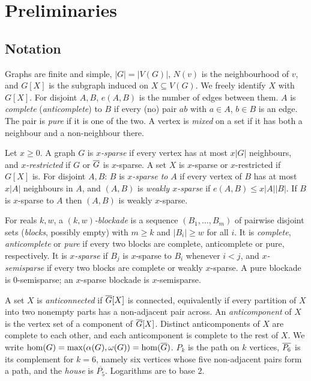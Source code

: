 \setcounter{section}{-1}
\section{Preliminaries}\label{sec:prelim}

\subsection{Notation}
Graphs are finite and simple, $|G|=|V(G)|$, $N(v)$ is the neighbourhood of $v$, and $G[X]$ is the
subgraph induced on $X\subseteq V(G)$. We freely identify $X$ with $G[X]$. For disjoint $A,B$, $e(A,B)$ is
the number of edges between them. $A$ is \emph{complete} (\emph{anticomplete}) to $B$ if every (no) pair
$ab$ with $a\in A$, $b\in B$ is an edge. The pair is \emph{pure} if it is one of the two. A vertex is
\emph{mixed} on a set if it has both a neighbour and a non-neighbour there.

\begin{definition}[Sparsity]
Let $x\ge0$. A graph $G$ is \emph{$x$-sparse} if every vertex has at most $x|G|$ neighbours, and
\emph{$x$-restricted} if $G$ or $\overline{G}$ is $x$-sparse. A set $X$ is $x$-sparse or $x$-restricted if $G[X]$
is. For disjoint $A,B$: $B$ is \emph{$x$-sparse to} $A$ if every vertex of $B$ has at most $x|A|$
neighbours in $A$, and $(A,B)$ is \emph{weakly $x$-sparse} if $e(A,B)\le x|A||B|$. If $B$ is $x$-sparse to
$A$ then $(A,B)$ is weakly $x$-sparse.
\end{definition}

\begin{definition}[Blockades]
For reals $k,w$, a \emph{$(k,w)$-blockade} is a sequence $(B_1,\dots,B_m)$ of pairwise disjoint sets
(\emph{blocks}, possibly empty) with $m\ge k$ and $|B_i|\ge w$ for all $i$. It is \emph{complete},
\emph{anticomplete} or \emph{pure} if every two blocks are complete, anticomplete or pure, respectively.
It is \emph{$x$-sparse} if $B_j$ is $x$-sparse to $B_i$ whenever $i<j$, and \emph{$x$-semisparse} if every
two blocks are complete or weakly $x$-sparse. A pure blockade is $0$-semisparse; an $x$-sparse blockade is
$x$-semisparse.
\end{definition}

A set $X$ is \emph{anticonnected} if $\overline{G}[X]$ is connected, equivalently if every partition of $X$ into
two nonempty parts has a non-adjacent pair across. An \emph{anticomponent} of $X$ is the vertex set of a
component of $\overline{G}[X]$. Distinct anticomponents of $X$ are complete to each other, and each anticomponent
is complete to the rest of $X$. We write $\hom(G)=\max(\alpha(G),\omega(G))=\hom(\overline{G})$. $P_k$ is the
path on $k$ vertices, $\overline{P_6}$ is its complement for $k=6$, namely six vertices whose five non-adjacent pairs
form a path, and the \emph{house} is $\overline{P_5}$. Logarithms are to base $2$.


